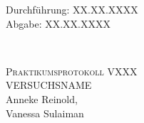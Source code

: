 



\begin{titlepage}
  \begin{flushleft}
 Durchführung: XX.XX.XXXX\\
 Abgabe: XX.XX.XXXX
  \end{flushleft}


\HRule\\[1,0cm]

 \begin{center}


\textsc{\LARGE Praktikumsprotokoll VXXX}\\[1.5cm]
\textsc{\huge VERSUCHSNAME} \\[5,5cm]

Anneke Reinold\footnotemark[1], \\
Vanessa Sulaiman\footnotemark[2] \\[1,0cm]



 \end{center}
\HRule

 \vfill

\end{titlepage}






\printbibliography


